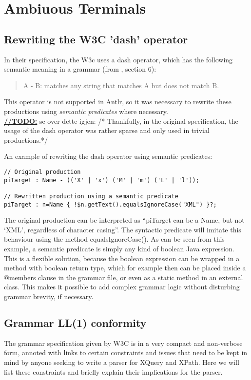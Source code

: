 \section{Ambiuous Terminals}



\subsection{Rewriting the W3C 'dash' operator}
In their specification, the W3c uses a dash operator, which has the following
semantic meaning in a grammar (from \cite{w3c03}, section 6):
\begin{quote}
A - B: matches any string that matches A but does not match B.
\end{quote}
This operator is not supported in Antlr, so it was necessary to rewrite
these productions using \emph{semantic predicates} where necessary.
\\ \underline{\textbf{\LARGE //TODO:}} se over dette igjen: /* Thankfully,
in the original specification, the usage of the dash operator was rather sparse
and only used in trivial productions.*/

An example of rewriting the dash operator using semantic predicates:
\begin{verbatim}
// Original production
piTarget : Name - (('X' | 'x') ('M' | 'm') ('L' | 'l'));

// Rewritten production using a semantic predicate
piTarget : n=Name { !$n.getText().equalsIgnoreCase("XML") }?;
\end{verbatim}
The original production can be interpreted as ``piTarget can be a Name, but not
`XML', regardless of character casing''. The syntactic predicate will imitate
this behaviour using the method equalsIgnoreCase(). As can be seen from this
example, a semantic predicate is simply any kind of boolean Java expression.
This is a flexible solution, because the boolean expression can be wrapped in a
method with boolean return type, which for example then can be placed inside a
@members { } clause in the grammar file, or even as a static method in an
external class. This makes it possible to add complex grammar logic without
disturbing grammar brevity, if necessary.

\subsection{Grammar LL(1) conformity}
The grammar specification given by W3C is in a very compact and non-verbose
form, annoted with links to certain constraints and issues that need to be kept
in mind by anyone seeking to write a parser for XQuery and XPath. Here we will
list these constraints and briefly explain their implications for the parser.

